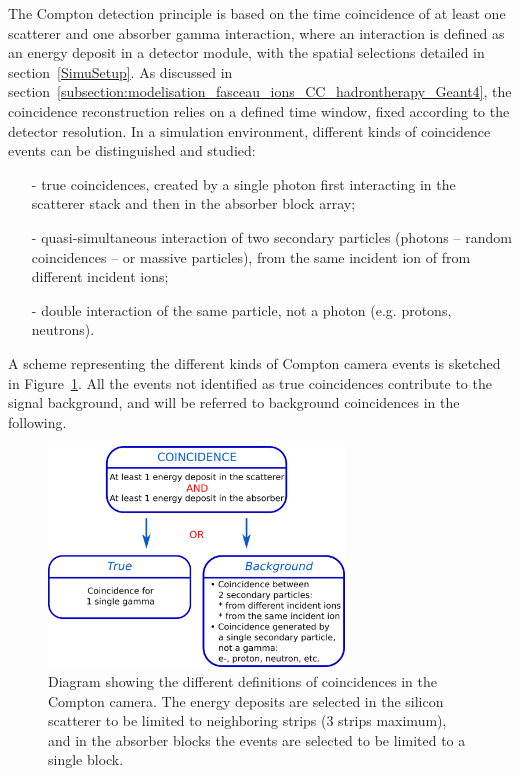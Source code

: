 The Compton detection principle is based on the time coincidence of at least one scatterer and one absorber gamma interaction, where an interaction is defined as an energy deposit in a detector module, with the spatial selections detailed in section~\ref{SimuSetup}. As discussed in section~\ref{subsection:modelisation_fasceau_ions_CC_hadrontherapy_Geant4}, the coincidence reconstruction relies on a defined time window, fixed according to the detector resolution. In a simulation environment, different kinds of coincidence events can be distinguished and studied: 
\begin{itemize}
\item[-] true coincidences, created by a single photon first interacting in the scatterer stack and then in the absorber block array;
\item[-] quasi-simultaneous interaction of two secondary particles (photons -- random coincidences -- or massive particles), from the same incident ion of from different incident ions;
\item[-] double interaction of the same particle, not a photon (e.g. protons, neutrons).
\end{itemize}
A scheme representing the different kinds of Compton camera events is sketched in Figure~\ref{fig::coincidence_CC_simulation_Hadronth}.
All the events not identified as true coincidences contribute to the signal background, and will be referred to background coincidences in the following.
\begin{figure}
  \centering
  \includegraphics[width=0.7\textwidth]{./Figure/coinc_scheme.png}
  \caption{Diagram showing the different definitions of coincidences in the Compton camera. The energy deposits are selected in the silicon scatterer to be limited to neighboring strips (3 strips maximum), and in the absorber blocks the events are selected to be limited to a single block.}
 \label{fig::coincidence_CC_simulation_Hadronth}
\end{figure}


